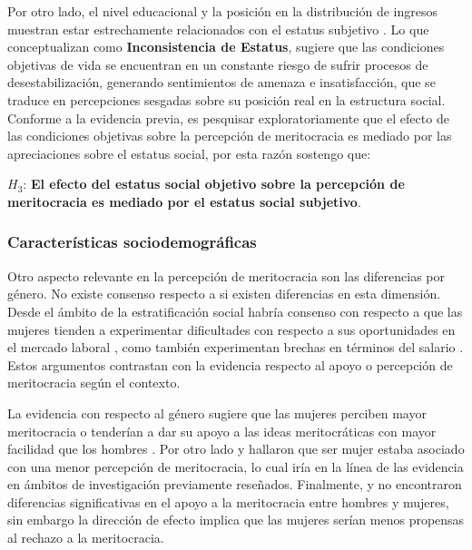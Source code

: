 \documentclass[12pt]{article}
\begin{document}
Por otro lado, el nivel educacional y la posición en la distribución de ingresos muestran estar estrechamente relacionados con el estatus subjetivo \citep{Castillo2013,Lindemann2014}. Lo que \cite{Araujo2011} conceptualizan como \textbf{Inconsistencia de Estatus}, sugiere que las condiciones objetivas de vida se encuentran en un constante riesgo de sufrir procesos de desestabilización, generando sentimientos de amenaza e insatisfacción, que se traduce en percepciones sesgadas sobre su posición real en la estructura social. Conforme a la evidencia previa, es pesquisar exploratoriamente que el efecto de las condiciones objetivas sobre la percepción de meritocracia es mediado por las apreciaciones sobre el estatus social, por esta razón sostengo que:                      

$H_{\text{3}}$: \textbf{El efecto del estatus social objetivo sobre la percepción de meritocracia es mediado por el estatus social subjetivo}.
		
\subsubsection*{Características sociodemográficas}
	
Otro aspecto relevante en la percepción de meritocracia son las diferencias por género. No existe consenso respecto a si existen diferencias en esta dimensión. Desde el ámbito de la estratificación social habría consenso con respecto a que las mujeres tienden a experimentar dificultades con respecto a sus oportunidades en el mercado laboral \citep{Laurison2016}, como también experimentan brechas en términos del salario \citep{Bobbitt-zeher2007, Cha2010}. Estos argumentos contrastan con la evidencia respecto al apoyo o percepción de meritocracia según el contexto. 

La evidencia con respecto al género sugiere que las mujeres perciben mayor meritocracia o tenderían a dar su apoyo a las ideas meritocráticas con mayor facilidad que los hombres \citep{Kunovich2007,Reynolds2014,Sandoval2017}. Por otro lado \citet{Duru-bellat2012} y \citet{Ellis2017} hallaron que ser mujer estaba asociado con una menor percepción de meritocracia, lo cual iría en la línea de las evidencia en ámbitos de investigación previamente reseñados. Finalmente, \citet{Newman2015} y \citet{Solt2016} no encontraron diferencias significativas en el apoyo a la meritocracia entre hombres y mujeres, sin embargo la dirección de efecto implica que las mujeres serían menos propensas al rechazo a la meritocracia. 
\end{document}

